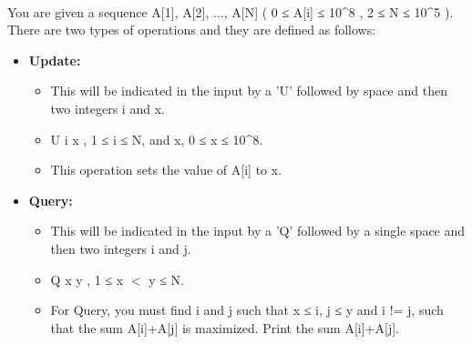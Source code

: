  

You are given a sequence A[1], A[2], ..., A[N] ( 0 ≤ A[i] ≤ 10^8 , 2 ≤ N ≤ 10^5 ). There are two types of operations and they are defined as follows:
\begin{itemize}
	\item \textbf{Update: }
\begin{itemize}
	\item \textbf{​}This will be indicated in the input by a 'U' followed by space and then two integers i and x.
	\item U i x , 1 ≤ i ≤ N, and x, 0 ≤ x ≤ 10^8.
	\item This operation sets the value of A[i] to x.
\end{itemize}
	\item \textbf{Query:}
\begin{itemize}
	\item This will be indicated in the input by a 'Q' followed by a single space and then two integers i and j.
	\item Q x y , 1 ≤ x $<$ y ≤ N.
	\item For Query, you must find i and j such that x ≤ i, j ≤ y and i != j, such that the sum A[i]+A[j] is maximized. Print the sum A[i]+A[j].
\end{itemize}
\end{itemize}